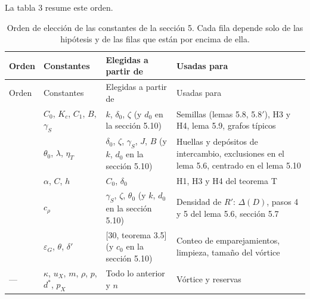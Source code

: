 \documentclass[spanish,11pt,a4paper]{article}
\begin{document}
La tabla 3 resume este orden.

\begin{longtable}[]{@{}
  >{\raggedright\arraybackslash}p{}
  >{\raggedright\arraybackslash}p{}
  >{\raggedright\arraybackslash}p{}
  >{\raggedright\arraybackslash}p{}@{}}
\caption{Orden de elección de las constantes de la sección 5. Cada fila depende solo de las hipótesis y de las filas que están por encima de ella.}\tabularnewline
\toprule\noalign{}
\begin{minipage}[b]{\linewidth}\raggedright
Orden
\end{minipage} & \begin{minipage}[b]{\linewidth}\raggedright
Constantes
\end{minipage} & \begin{minipage}[b]{\linewidth}\raggedright
Elegidas a partir de
\end{minipage} & \begin{minipage}[b]{\linewidth}\raggedright
Usadas para
\end{minipage} \\
\midrule\noalign{}
\endfirsthead
\toprule\noalign{}
\begin{minipage}[b]{\linewidth}\raggedright
Orden
\end{minipage} & \begin{minipage}[b]{\linewidth}\raggedright
Constantes
\end{minipage} & \begin{minipage}[b]{\linewidth}\raggedright
Elegidas a partir de
\end{minipage} & \begin{minipage}[b]{\linewidth}\raggedright
Usadas para
\end{minipage} \\
\midrule\noalign{}
\endhead
\bottomrule\noalign{}
\endlastfoot
1 & \(C_0\), \(K_c\), \(C_1\), \(B\), \(\gamma_S\) & \(k\), \(\delta_0\), \(\zeta\) (y \(d_0\) en la sección 5.10) & Semillas (lemas 5.8, 5.8\('\)), H3 y H4, lema 5.9, grafos típicos \\
2 & \(\theta_0\), \(\lambda\), \(\eta_T\) & \(\delta_0\), \(\zeta\), \(\gamma_S\), \(J\), \(B\) (y \(k\), \(d_0\) en la sección 5.10) & Huellas y depósitos de intercambio, exclusiones en el lema 5.6, centrado en el lema 5.10 \\
3 & \(\alpha\), \(C\), \(h\) & \(C_0\), \(\delta_0\) & H1, H3 y H4 del teorema T \\
4 & \(c_\rho\) & \(\gamma_S\), \(\zeta\), \(\theta_0\) (y \(k\), \(d_0\) en la sección 5.10) & Densidad de \(R'\): \(\Delta(D)\), pasos 4 y 5 del lema 5.6, sección 5.7 \\
5 & \(\varepsilon_G\), \(\theta\), \(\delta'\) & {[}30, teorema 3.5{]} (y \(c_0\) en la sección 5.10) & Conteo de emparejamientos, limpieza, tamaño del vórtice \\
--- & \(\kappa\), \(u_X\), \(m\), \(\rho\), \(p\), \(d^*\), \(p_X\) & Todo lo anterior y \(n\) & Vórtice y reservas \\
\end{longtable}
\end{document}
